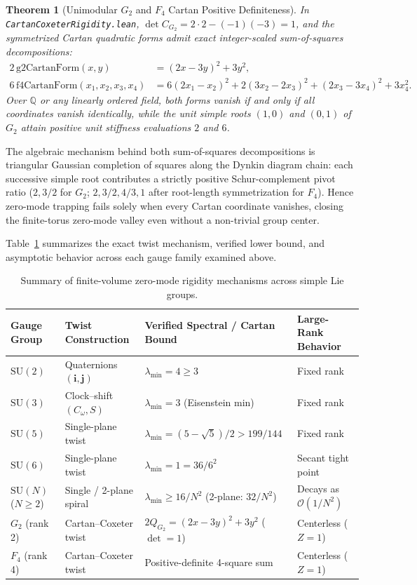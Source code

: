 \documentclass[11pt,a4paper]{article}
\newtheorem{theorem}{Theorem}[section]
\newcommand{\Q}{\mathbb{Q}}
\newcommand{\SU}{\mathrm{SU}}
\begin{document}
\begin{theorem}[Unimodular $G_2$ and $F_4$ Cartan Positive Definiteness]
In \texttt{Cartan\-Coxeter\-Rigidity.lean}, $\det C_{G_2} = 2 \cdot 2 - (-1)(-3) = 1$, and the symmetrized Cartan quadratic forms admit exact integer-scaled sum-of-squares decompositions:
\begin{align}
2 \, \mathrm{g2CartanForm}(x, y) &= (2x - 3y)^2 + 3y^2, \\
6 \, \mathrm{f4CartanForm}(x_1, x_2, x_3, x_4) &= 6(2x_1 - x_2)^2 + 2(3x_2 - 2x_3)^2 + (2x_3 - 3x_4)^2 + 3x_4^2.
\end{align}
Over $\Q$ or any linearly ordered field, both forms vanish if and only if all coordinates vanish identically, while the unit simple roots $(1, 0)$ and $(0, 1)$ of $G_2$ attain positive unit stiffness evaluations $2$ and $6$.
\end{theorem}

The algebraic mechanism behind both sum-of-squares decompositions is triangular Gaussian completion of squares along the Dynkin diagram chain: each successive simple root contributes a strictly positive Schur-complement pivot ratio ($2, 3/2$ for $G_2$; $2, 3/2, 4/3, 1$ after root-length symmetrization for $F_4$). Hence zero-mode trapping fails solely when every Cartan coordinate vanishes, closing the finite-torus zero-mode valley even without a non-trivial group center.

Table~\ref{tab:group-comparison} summarizes the exact twist mechanism, verified lower bound, and asymptotic behavior across each gauge family examined above.

\begin{table}[ht]
\centering
\small
\begin{tabular}{@{}llll@{}}
\toprule
Gauge Group & Twist Construction & Verified Spectral / Cartan Bound & Large-Rank Behavior \\
\midrule
$\SU(2)$ & Quaternions $(\mathbf{i}, \mathbf{j})$ & $\lambda_{\min} = 4 \ge 3$ & Fixed rank \\
$\SU(3)$ & Clock--shift $(C_\omega, S)$ & $\lambda_{\min} = 3$ (Eisenstein min) & Fixed rank \\
$\SU(5)$ & Single-plane twist & $\lambda_{\min} = (5-\sqrt{5})/2 > 199/144$ & Fixed rank \\
$\SU(6)$ & Single-plane twist & $\lambda_{\min} = 1 = 36/6^2$ & Secant tight point \\
$\SU(N)$ ($N \ge 2$) & Single / 2-plane spiral & $\lambda_{\min} \ge 16/N^2$ (2-plane: $32/N^2$) & Decays as $\mathcal{O}(1/N^2)$ \\
$G_2$ (rank 2) & Cartan--Coxeter twist & $2 Q_{G_2} = (2x-3y)^2 + 3y^2$ ($\det = 1$) & Centerless ($Z = 1$) \\
$F_4$ (rank 4) & Cartan--Coxeter twist & Positive-definite 4-square sum & Centerless ($Z = 1$) \\
\bottomrule
\end{tabular}
\caption{Summary of finite-volume zero-mode rigidity mechanisms across simple Lie groups.}
\label{tab:group-comparison}
\end{table}
\end{document}
